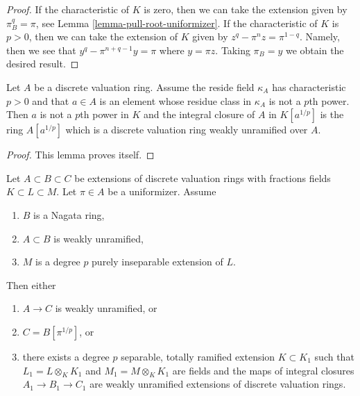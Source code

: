 \begin{proof}
If the characteristic of $K$ is zero, then we can take the
extension given by $\pi_B^q = \pi$, see
Lemma \ref{lemma-pull-root-uniformizer}.
If the characteristic of $K$ is $p > 0$, then we can take the
extension of $K$ given by $z^q - \pi^n z = \pi^{1 - q}$.
Namely, then we see that $y^q - \pi^{n + q - 1} y = \pi$
where $y = \pi z$. Taking $\pi_B = y$ we obtain the desired result.
\end{proof}

\begin{lemma}
\label{lemma-pre-purely-inseparable-case}
Let $A$ be a discrete valuation ring. Assume the reside field $\kappa_A$ has
characteristic $p > 0$ and that $a \in A$ is an element whose residue
class in $\kappa_A$ is not a $p$th power. Then $a$ is not a $p$th power in $K$
and the integral closure of $A$ in $K[a^{1/p}]$ is the ring $A[a^{1/p}]$
which is a discrete valuation ring weakly unramified over $A$.
\end{lemma}

\begin{proof}
This lemma proves itself.
\end{proof}

\begin{lemma}
\label{lemma-purely-inseparable-case}
Let $A \subset B \subset C$ be extensions of discrete valuation rings
with fractions fields $K \subset L \subset M$. Let $\pi \in A$ be a
uniformizer. Assume
\begin{enumerate}
\item $B$ is a Nagata ring,
\item $A \subset B$ is weakly unramified,
\item $M$ is a degree $p$ purely inseparable extension of $L$.
\end{enumerate}
Then either
\begin{enumerate}
\item $A \to C$ is weakly unramified, or
\item $C = B[\pi^{1/p}]$, or
\item there exists a degree $p$ separable, totally ramified extension
$K \subset K_1$ such that $L_1 = L \otimes_K K_1$ and $M_1 = M \otimes_K K_1$
are fields and the maps of integral closures $A_1 \to B_1 \to C_1$
are weakly unramified extensions of discrete valuation rings.
\end{enumerate}
\end{lemma}

